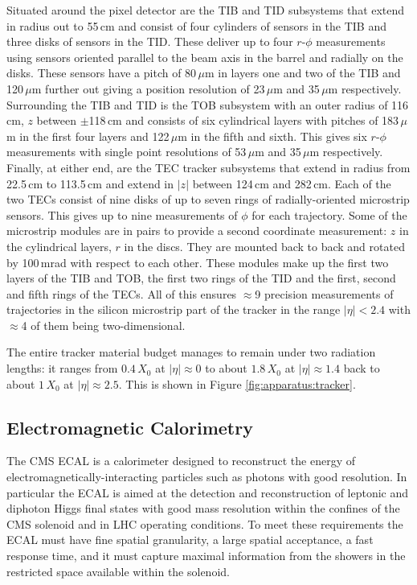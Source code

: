 Situated around the pixel detector are the TIB and TID subsystems that extend in radius out to 55\,cm and consist of four cylinders of sensors in the TIB and three disks of sensors in the TID. These deliver up to four $r$-$\phi$ measurements using sensors oriented parallel to the beam axis in the barrel and radially on the disks. These sensors have a pitch of 80\,$\mu$m in layers one and two of the TIB and 120\,$\mu$m further out giving a position resolution of 23\,$\mu$m and 35\,$\mu$m respectively. 
Surrounding the TIB and TID is the TOB subsystem with an outer radius of 116\,cm, $z$ between $\pm$118\,cm and consists of six cylindrical layers with pitches of 183\,$\mu$m in the first four layers and 122\,$\mu$m in the fifth and sixth. This gives six $r$-$\phi$ measurements with single point resolutions of 53\,$\mu$m and 35\,$\mu$m respectively. 
Finally, at either end, are the TEC tracker subsystems that extend in radius from 22.5\,cm to 113.5\,cm and extend in $|z|$ between 124\,cm and 282\,cm. Each of the two TECs consist of nine disks of up to seven rings of radially-oriented microstrip sensors. This gives up to nine measurements of $\phi$ for each trajectory.  
Some of the microstrip modules are in pairs to provide a second coordinate measurement: $z$ in the cylindrical layers, $r$ in the discs. They are mounted back to back and rotated by 100\,mrad with respect to each other. These modules make up the first two layers of the TIB and TOB, the first two rings of the TID and the first, second and fifth rings of the TECs.  
All of this ensures $\approx$9 precision measurements of trajectories in the silicon microstrip part of the tracker in the range $|\eta|<2.4$ with $\approx$4 of them being two-dimensional.


The entire tracker material budget manages to remain under two radiation lengths: it ranges from $0.4$\,$X_{0}$ at $|\eta|\approx{0}$ to about $1.8$\,$X_{0}$ at $|\eta|\approx{1.4}$ back to about $1$\,$X_{0}$ at $|\eta|\approx{2.5}$. This is shown in Figure \ref{fig:apparatus:tracker}.


\subsection{Electromagnetic Calorimetry}

The CMS ECAL \cite{CMSEcalTDR} is a calorimeter designed to reconstruct the energy of electromagnetically-interacting particles such as photons with good resolution. In particular the ECAL is aimed at the detection and reconstruction of leptonic and diphoton Higgs final states with good mass resolution within the confines of the CMS solenoid and in LHC operating conditions. To meet these requirements the ECAL must have fine spatial granularity, a large spatial acceptance, a fast response time, and it must capture maximal information from the showers in the restricted space available within the solenoid. 

